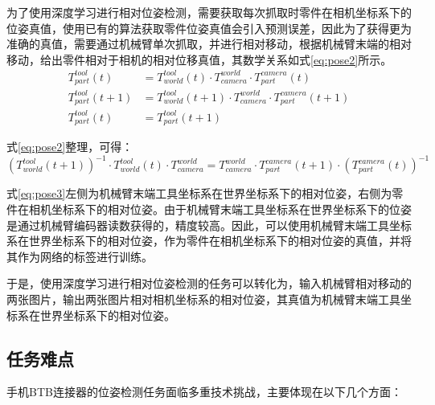 \documentclass{Diploma}
\begin{document}
为了使用深度学习进行相对位姿检测，需要获取每次抓取时零件在相机坐标系下的位姿真值，使用已有的算法获取零件位姿真值会引入预测误差，因此为了获得更为准确的真值，需要通过机械臂单次抓取，并进行相对移动，根据机械臂末端的相对移动，给出零件相对于相机的相对位移真值，其数学关系如式\eqref{eq:pose2}所示。
\begin{equation} \label{eq:pose2}
\begin{aligned} 
  T_{part}^{tool}(t) &= T_{world}^{tool}(t) \cdot T_{camera}^{world} \cdot T_{part}^{camera}(t)  \\
  T_{part}^{tool}(t+1) &= T_{world}^{tool}(t+1) \cdot T_{camera}^{world} \cdot T_{part}^{camera}(t+1) \\
  T_{part}^{tool}(t) &= T_{part}^{tool}(t+1) 
\end{aligned}
\end{equation}

式\eqref{eq:pose2}整理，可得：
\begin{equation} \label{eq:pose3}
    (T_{world}^{tool}(t+1))^{-1} \cdot T_{world}^{tool}(t) \cdot T_{camera}^{world} = T_{camera}^{world} \cdot T_{part}^{camera}(t+1) \cdot (T_{part}^{camera}(t))^{-1}
\end{equation}

式\eqref{eq:pose3}左侧为机械臂末端工具坐标系在世界坐标系下的相对位姿，右侧为零件在相机坐标系下的相对位姿。由于机械臂末端工具坐标系在世界坐标系下的位姿是通过机械臂编码器读数获得的，精度较高。因此，可以使用机械臂末端工具坐标系在世界坐标系下的相对位姿，作为零件在相机坐标系下的相对位姿的真值，并将其作为网络的标签进行训练。

于是，使用深度学习进行相对位姿检测的任务可以转化为，输入机械臂相对移动的两张图片，输出两张图片相对相机坐标系的相对位姿，其真值为机械臂末端工具坐标系在世界坐标系下的相对位姿。
\subsection{任务难点}
手机BTB连接器的位姿检测任务面临多重技术挑战，主要体现在以下几个方面：
\end{document}

